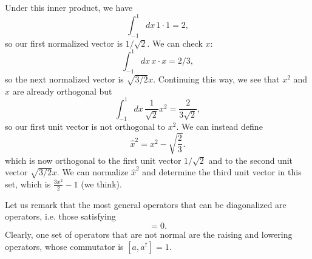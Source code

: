 Under this inner product, we have
\begin{equation}
    \int_{-1}^1 dx\, 1\cdot 1 = 2,
\end{equation}
so our first normalized vector is $1/\sqrt{2}$. We can check $x$:
\begin{equation}
    \int_{-1}^1 dx\, x\cdot x  =2/3,
\end{equation}
so the next normalized vector is $\sqrt{3/2}x.$ Continuing this way, we see that $x^2$ and $x$ are already orthogonal but
\begin{equation}
    \int_{-1}^1 dx\, \frac{1}{\sqrt{2}} x^2 = \frac{2}{3\sqrt{2}},
\end{equation}
so our first unit vector is not orthogonal to $x^2$. We can instead define
\begin{equation}
    \hat x^2 = x^2 -\sqrt{\frac{2}{3}}.%
\end{equation}
which is now orthogonal to the first unit vector $1/\sqrt{2}$ and to the second unit vector $\sqrt{3/2}x$. We can normalize $\hat x^2$ and determine the third unit vector in this set, which is $\frac{3x^2}{2}-1$ (we think).

Let us remark that the most general operators that can be diagonalized are  operators, i.e. those satisfying
\begin{equation}
    [A,A^\dagger]=0.
\end{equation}
Clearly, one set of operators that are not normal are the raising and lowering operators, whose commutator is $[a,a^\dagger]=1$.